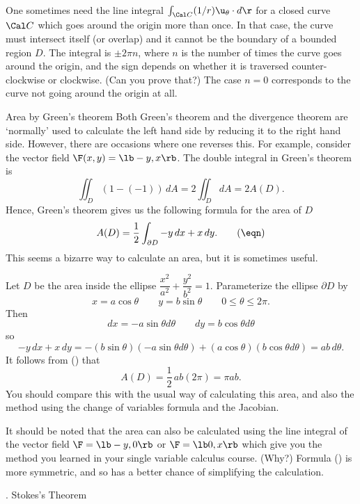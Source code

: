 One sometimes need the line integral $\int_{\Cal C} (1/r)\u_\theta\cdot
d\r$ for a closed curve $\Cal C$ which goes around the origin more
than once.  In that case, the curve must intersect itself (or overlap)
and it cannot be the boundary of a bounded region $D$.   The integral
is $\pm 2\pi n$, where $n$ is the number of times the curve goes around
the origin, and the sign depends on whether it is traversed
counter-clockwise or clockwise.  (Can you prove that?)  The case
$n = 0$ corresponds to the curve not going around the origin at all.

\subhead Area by Green's theorem \endsubhead
Both Green's theorem and the divergence theorem are `normally'
used to calculate the left hand side by reducing it to the right
hand side.  However, there are occasions where one reverses this.
For example, consider the vector field $\F(x,y) = \lb -y, x \rb$.
The double integral in Green's theorem is
$$
\iint_D (1 - (-1)) \,dA = 2\iint_D dA = 2 A(D).
$$
Hence, Green's theorem gives us the following formula for the
area of $D$
\nexteqn
$$
	A(D) = \frac 12 \int_{\partial D} -y\,dx + x\,dy.\tag\eqn
$$
%
This seems a bizarre way to calculate an area, but it is sometimes
useful.

\nextex
{}
Let $D$ be the area inside
the ellipse $\dfrac{x^2}{a^2} + \dfrac{y^2}{b^2} = 1$.
Parameterize  the ellipse $\partial D$ by
$$
x = a\cos\theta\qquad y = b\sin\theta\qquad 0\le \theta \le 2\pi.
$$
Then
$$
dx = -a \sin\theta d\theta\qquad dy = b\cos\theta d\theta
$$
so
$$
-y\,dx + x\,dy = -(b\sin\theta)(-a\sin\theta d\theta)
       + (a\cos\theta)(b\cos\theta d\theta) = ab\,d\theta.
$$
It follows from (\eqn) that
$$
A(D) = \frac 12 \,ab(2\pi) = \pi ab.
$$
You should compare this with the usual way of calculating this area,
and also the method using the change of variables formula and the
Jacobian.
\endexample

It should be noted that the area can also be calculated using the
line integral of the vector field $\F = \lb -y, 0 \rb$ or
$\F = \lb 0, x \rb$  which give you the method you
learned in your single variable calculus course.  (Why?)  Formula
(\eqn) is more symmetric, and so has a better chance of simplifying
the calculation.

\bigskip

\bigskip
{}
\head \sn. Stokes's Theorem \endhead

